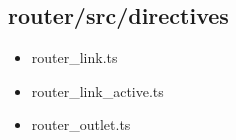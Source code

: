 \subsection{router/src/directives}


\begin{itemize}
  \item router\_link.ts
  \item router\_link\_active.ts
  \item router\_outlet.ts
\end{itemize}






























